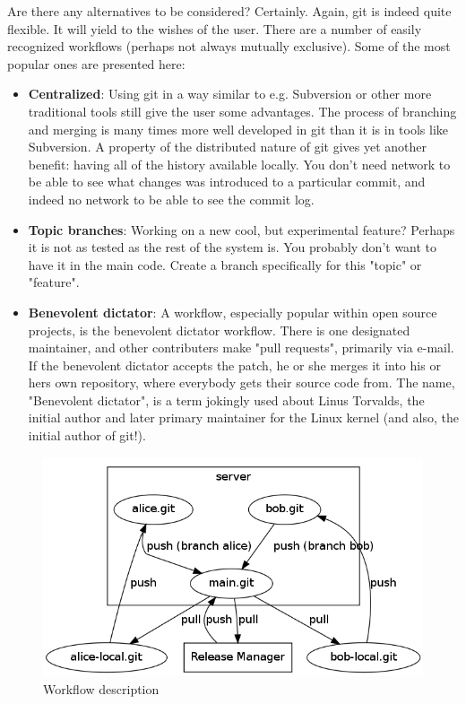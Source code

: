 \documentclass{llncs}
\begin{document}
Are there any alternatives to be considered? Certainly. Again, git is 
indeed quite flexible. It will yield to the wishes of the user. There are 
a number of easily recognized workflows (perhaps not always mutually
exclusive). Some of the most popular ones are presented here:

\begin{itemize}
 \item \textbf{Centralized}: 
  Using git in a way similar to e.g. Subversion or other more traditional
  tools still give the user some advantages. The process of branching and
  merging is many times more well developed in git than it is in tools like
  Subversion. A property of the distributed nature of git gives yet another
  benefit: having all of the history available locally. You don't need
  network to be able to see what changes was introduced to a particular
  commit, and indeed no network to be able to see the commit log.

 \item \textbf{Topic branches}: 
  Working on a new cool, but experimental feature? Perhaps it is not as 
  tested as the rest of the system is. You probably don't want to have 
  it in the main code. Create a branch specifically for this "topic" or
  "feature".

 \item \textbf{Benevolent dictator}: 
  A workflow, especially popular within open source projects, is the
  benevolent dictator workflow. There is one designated maintainer, and
  other contributers make "pull requests", primarily via e-mail.  If the
  benevolent dictator accepts the patch, he or she merges it into his or
  hers own repository, where everybody gets their source code from. The
  name, "Benevolent dictator", is a term jokingly used about Linus
  Torvalds, the initial author and later primary maintainer for the Linux
  kernel (and also, the initial author of git!).
\end{itemize}

\begin{figure}
 \begin{center}
  \includegraphics[scale=0.5]{workflow.png}
  \caption{Workflow description}
  \label{fig:workflow}
 \end{center}
\end{figure}
\end{document}
